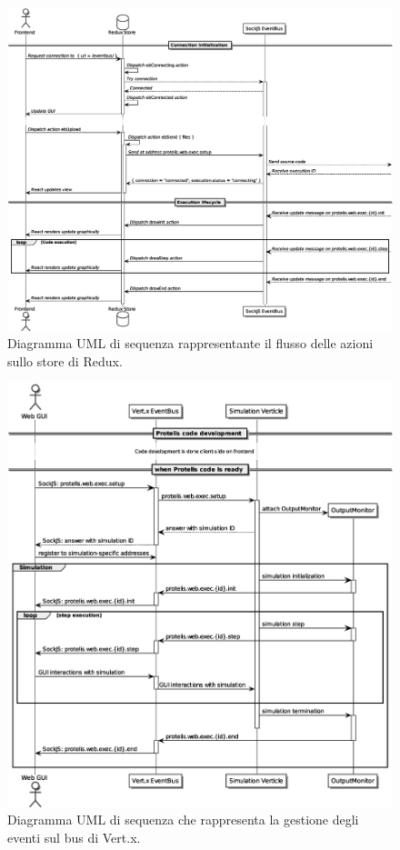       \begin{figure}[htbp]
        \centering
        \includegraphics[width=.95\textwidth]{res/uml/redux-eventbus.eps}%
        \caption{Diagramma UML di sequenza rappresentante il flusso delle azioni sullo store di Redux.}%
        \label{fig:event:redux}
      \end{figure}

      \begin{figure}[htbp]
        \centering
        \includegraphics[width=.95\textwidth]{res/uml/data-flow.eps}%
        \caption{Diagramma UML di sequenza che rappresenta la gestione degli eventi sul bus di Vert.x.}%
        \label{fig:event:vertx}
      \end{figure}
